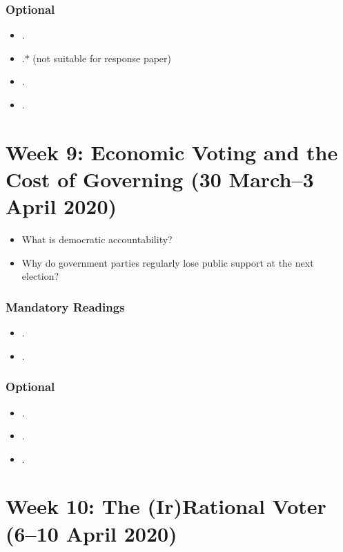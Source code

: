 \documentclass[abstract=on,parskip=full,headings=standardclasses,fontsize=11pt,paper=a4]{scrartcl}
\begin{document}
\subsubsection*{Optional}
\begin{itemize}
\item {}.
\item {}.* (not suitable for response paper)
\item {}.
\item {}.
\end{itemize}


\section{Week 9: Economic Voting and the Cost of Governing (30 March--3 April 2020)}


\begin{itemize}
\renewcommand\labelitemi{--}
\item What is democratic accountability?
\item Why do government parties  regularly lose public support at the next election?
\end{itemize}

\subsubsection*{Mandatory Readings}

\begin{itemize}
\item {}.
\item {}.
\end{itemize}

\subsubsection*{Optional}
\begin{itemize}
\item {}.
\item {}.
\item {}.
\end{itemize}

 
\section{Week 10: The (Ir)Rational Voter (6--10 April 2020)}
\end{document}
